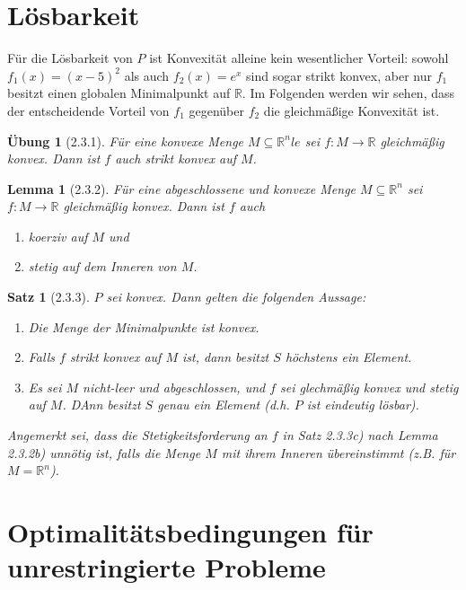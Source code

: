 \documentclass[12pt]{extreport} %
\newcommand{\R}{\mathbb{R}}
\theoremstyle{named}
\theoremstyle{nnamed}
\theoremstyle{itshape}
\newtheorem*{satz}{Satz}
\theoremstyle{normal}
\newtheorem*{lemma}{Lemma}
\newtheorem*{uebung}{Übung}
\begin{document}
\section{Lösbarkeit}

Für die Lösbarkeit von $P$ ist Konvexität alleine kein wesentlicher Vorteil: sowohl $f_1(x) = (x - 5)^2$ als auch $f_2(x) = e^x$ sind sogar strikt konvex, aber nur $f_1$ besitzt einen globalen Minimalpunkt auf $\R$. Im Folgenden werden wir sehen, dass der entscheidende Vorteil von $f_1$ gegenüber $f_2$ die gleichmäßige Konvexität ist.

\begin{uebung}[2.3.1] %
	Für eine konvexe Menge $M \subseteq \R^nle$ sei $f \colon M \rightarrow \R$ gleichmäßig konvex. Dann ist $f$ auch strikt konvex auf $M$.	
\end{uebung}

\begin{lemma}[2.3.2]
	Für eine abgeschlossene und konvexe Menge $M \subseteq \R^n$ sei $f \colon M \rightarrow \R$ gleichmäßig konvex. Dann ist $f$ auch
	\begin{enumerate}
		\item koerziv auf $M$ und
		\item stetig auf dem Inneren von $M$.
	\end{enumerate}
\end{lemma}

\begin{satz}[2.3.3]
	$P$ sei konvex. Dann gelten die folgenden Aussage:
	\begin{enumerate}
		\item Die Menge der Minimalpunkte ist konvex.
		\item Falls $f$ strikt konvex auf $M$ ist, dann besitzt $S$ höchstens ein Element.
		\item Es sei $M$ nicht-leer und abgeschlossen, und $f$ sei glechmäßig konvex und stetig auf $M$. DAnn besitzt $S$ genau ein Element (d.h. $P$ ist eindeutig lösbar).
	\end{enumerate}	
	Angemerkt sei, dass die Stetigkeitsforderung an $f$ in Satz 2.3.3c) nach Lemma 2.3.2b) unnötig ist, falls die Menge $M$ mit ihrem Inneren übereinstimmt (z.B. für $M = \R^n$).
\end{satz}

\section{Optimalitätsbedingungen für unrestringierte Probleme}
\end{document}
